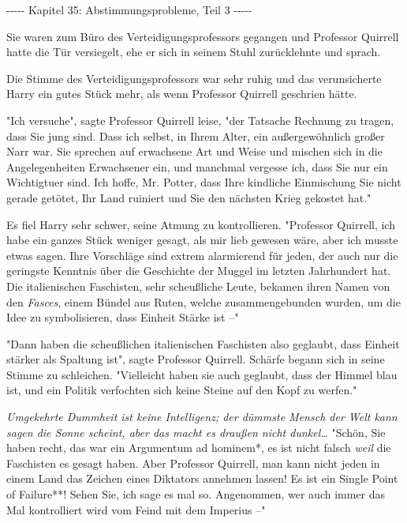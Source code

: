 

\hypertarget{abstimmungsprobleme-teil-3}{%

-\/-\/-\/-\/- Kapitel 35: Abstimmungsprobleme, Teil 3 -\/-\/-\/-\/-

Sie waren zum Büro des Verteidigungsprofessors gegangen und Professor Quirrell hatte die Tür versiegelt, ehe er sich in seinem Stuhl zurücklehnte und sprach.

Die Stimme des Verteidigungsprofessors war sehr ruhig und das verunsicherte Harry ein gutes Stück mehr, als wenn Professor Quirrell geschrien hätte.

"Ich versuche", sagte Professor Quirrell leise, "der Tatsache Rechnung zu tragen, dass Sie jung sind. Dass ich selbst, in Ihrem Alter, ein außergewöhnlich großer Narr war. Sie sprechen auf erwachsene Art und Weise und mischen sich in die Angelegenheiten Erwachsener ein, und manchmal vergesse ich, dass Sie nur ein Wichtigtuer sind. Ich hoffe, Mr. Potter, dass Ihre kindliche Einmischung Sie nicht gerade getötet, Ihr Land ruiniert und Sie den nächsten Krieg gekostet hat."

Es fiel Harry sehr schwer, seine Atmung zu kontrollieren. "Professor Quirrell, ich habe ein ganzes Stück weniger gesagt, als mir lieb gewesen wäre, aber ich musste etwas sagen. Ihre Vorschläge sind extrem alarmierend für jeden, der auch nur die geringste Kenntnis über die Geschichte der Muggel im letzten Jahrhundert hat. Die italienischen Faschisten, sehr scheußliche Leute, bekamen ihren Namen von den \emph{Fasces}, einem Bündel aus Ruten, welche zusammengebunden wurden, um die Idee zu symbolisieren, dass Einheit Stärke ist --"

"Dann haben die scheußlichen italienischen Faschisten also geglaubt, dass Einheit stärker als Spaltung ist", sagte Professor Quirrell. Schärfe begann sich in seine Stimme zu schleichen. "Vielleicht haben sie auch geglaubt, dass der Himmel blau ist, und ein Politik verfochten sich keine Steine auf den Kopf zu werfen."

\emph{Umgekehrte Dummheit ist keine Intelligenz; der dümmste Mensch der Welt kann sagen die Sonne scheint, aber das macht es draußen nicht dunkel…} "Schön, Sie haben recht, das war ein Argumentum ad hominem*, es ist nicht falsch \emph{weil} die Faschisten es gesagt haben. Aber Professor Quirrell, man kann nicht jeden in einem Land das Zeichen eines Diktators annehmen lassen! Es ist ein Single Point of Failure**! Sehen Sie, ich sage es mal so. Angenommen, wer auch immer das Mal kontrolliert wird vom Feind mit dem Imperius --"

}
